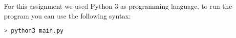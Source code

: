 For this assignment we used Python 3 as programming language, to run the program you can use the following syntax:

\begin{lstlisting}[language=bash]
> python3 main.py
\end{lstlisting}

